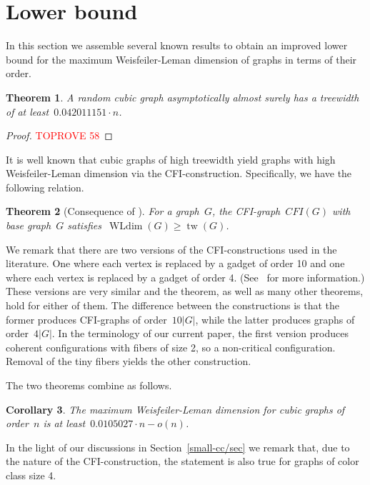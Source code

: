 \documentclass[english,a4paper]{article}
\theoremstyle{plain}
\newtheorem{theorem}             {Theorem}[section]
\newtheorem{corollary}  [theorem]{Corollary}
\theoremstyle{definition}
\DeclareMathOperator*{\WLdim}{WLdim}
\newcommand{\wldim}[1]{\ensuremath{\WLdim\left(#1\right)}}
\DeclareMathOperator{\treewidth}{tw}
\begin{document}
\section{Lower bound}
\label{sec:lower:bound}


In this section we assemble several known results to obtain an improved lower bound for the maximum Weisfeiler-Leman dimension of graphs in terms of their order.


\begin{theorem}
    A random cubic graph asymptotically almost surely has a treewidth of at least~$ 0.042011151 \cdot n$.
\end{theorem}
\begin{proof}\textcolor{red}{TOPROVE 58}\end{proof}


It is well known that cubic graphs of high treewidth yield graphs with high Weisfeiler-Leman dimension via the CFI-construction.
Specifically, we have the following relation.


\begin{theorem}[Consequence of {\cite[Theorem 3]{DBLP:conf/csl/DawarR07}}]
    For a graph~$G$, the CFI-graph~$CFI(G)$ with base graph~$G$ satisfies~$\wldim{G}\geq \treewidth(G)$.
\end{theorem}


We remark that there are two versions of the CFI-constructions used in the literature. One where each vertex is replaced by a gadget of order 10 and one where each vertex is replaced by a gadget of order 4. (See~\cite{DBLP:conf/icalp/Furer01,DBLP:conf/esa/NeuenS17,tuprints24244} for more information.)
These versions are very similar and the theorem, as well as many other theorems, hold for either of them.
The difference between the constructions is that the former produces CFI-graphs of order~$10 |G|$, while the latter produces graphs of order~$4|G|$. In the terminology of our current paper, the first version produces coherent configurations with fibers of size 2, so a non-critical configuration. Removal of the tiny fibers yields the other construction.


The two theorems combine as follows.


\begin{corollary}
    The maximum Weisfeiler-Leman dimension for cubic graphs of order~$n$ is at least~$0.0105027 \cdot  n -o(n)$.
\end{corollary}


In the light of our discussions in Section~\ref{small-cc/sec} we remark that, due to the nature of the CFI-construction, the statement is also true for graphs of color class size 4.     
\end{document}

